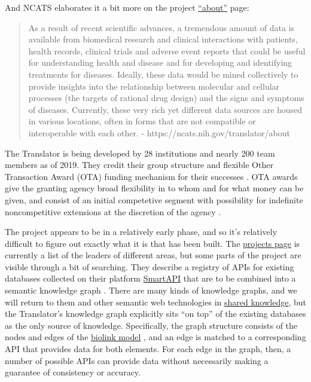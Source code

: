 \documentclass[10pt]{tufte-book}
\begin{document}
And NCATS elaborates it a bit more on the project
\href{https://ncats.nih.gov/translator/about}{``about''} page:

\begin{quote}
As a result of recent scientific advances, a tremendous amount of data
is available from biomedical research and clinical interactions with
patients, health records, clinical trials and adverse event reports that
could be useful for understanding health and disease and for developing
and identifying treatments for diseases. Ideally, these data would be
mined collectively to provide insights into the relationship between
molecular and cellular processes (the targets of rational drug design)
and the signs and symptoms of diseases. Currently, these very rich yet
different data sources are housed in various locations, often in forms
that are not compatible or interoperable with each other. -
https://ncats.nih.gov/translator/about
\end{quote}

The Translator is being developed by 28 institutions and nearly 200 team
members as of 2019. They credit their group structure and flexible Other
Transaction Award (OTA) funding mechanism for their successes \citep{consortiumBiomedicalDataTranslator2019} . OTA awards give the
granting agency broad flexibility in to whom and for what money can be
given, and consist of an initial competetive segment with possibility
for indefinite noncompetitive extensions at the discretion of the agency
\citep{fleisherOtherTransactionAward2019} .

The project appears to be in a relatively early phase, and so it's
relatively difficult to figure out exactly what it is that has been
built. The
\href{https://web.archive.org/web/20210710012427/https://ncats.nih.gov/translator/projects}{projects
page} is currently a list of the leaders of different areas, but some
parts of the project are visible through a bit of searching. They
describe a registry of APIs for existing databases collected on their
platform \href{https://smart-api.info/portal/translator}{SmartAPI} that
are to be combined into a semantic knowledge graph \citep{consortiumUniversalBiomedicalData2019} . There are many kinds of
knowledge graphs, and we will return to them and other semantic web
technologies in \protect\hyperlink{shared-knowledge}{shared knowledge},
but the Translator's knowledge graph explicitly sits ``on top'' of the
existing databases as the only source of knowledge. Specifically, the
graph structure consists of the nodes and edges of the
\href{https://github.com/biolink/biolink-model}{biolink model} \citep{bruskiewichBiolinkBiolinkmodel2021} , and an edge is matched to a
corresponding API that provides data for both elements. For each edge in
the graph, then, a number of possible APIs can provide data without
necessarily making a guarantee of consistency or accuracy.
\end{document}
